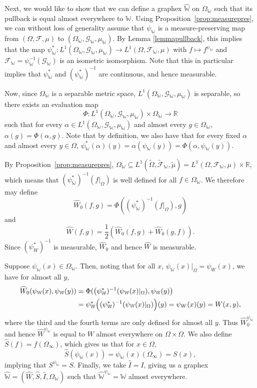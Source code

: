 \documentclass{amsart}
\numberwithin{equation}{section}
\numberwithin{figure}{section}
\theoremstyle{definition}
\theoremstyle{remark}
\newcommand{\wOmega}{{\widetilde{\Omega}}}
\newcommand{\wcF}{\widetilde{\mathcal{F}}}
\newcommand{\wmu}{\widetilde{\mu}}
\newcommand{\RR}{\mathbb{R}}
\newcommand{\cW}{\mathbb{W}}
\newcommand{\cF}{\mathcal{F}}
\newcommand{\cG}{\mathcal{G}}
\begin{document}
Next, we would like to show that we can define a graphex $\widehat{\cW}$ on
$\Omega_\cW $ such that its pullback is equal almost everywhere to $\cW$.
Using Proposition~\ref{prop:measurepres}, we can without loss of generality
assume that $\psi_\cW$ is a measure-preserving map from $(\Omega,\cF,\mu)$ to
$(\Omega_\cW,{\cG}_\cW,\mu_\cW)$. By Lemma \ref{lemmapullback}, this implies
that the map $\psi_\cW^*\colon L^1(\Omega_\cW,{\cG}_\cW,\mu_\cW) \rightarrow
L^1(\Omega,{\cF}_\cW,\mu)$ with $f\mapsto f^{\psi_\cW}$ and
${\cF}_\cW=\psi_\cW^{-1}(\cG_\cW)$ is an isometric isomorphism. Note that
this in particular implies that $\psi_\cW^*$ and $(\psi_\cW^*)^{-1}$ are
continuous, and hence measurable.

Now, since $\Omega_\cW$ is a separable metric space,
$L^1(\Omega_\cW,{\cG}_\cW,\mu_\cW)$ is separable, so there exists an
evaluation map
\[
\Phi\colon L^1(\Omega_\cW,{\cG}_\cW,\mu_\cW) \times \Omega_\cW \rightarrow \mathbb{R}
\]
such that for every $\alpha \in L^1(\Omega_\cW,{\cG}_\cW,\mu_\cW)$ and almost
every $g \in \Omega_\cW$, $\alpha(g)=\Phi(\alpha,g)$. Note that by
definition, we also have that for every fixed $\alpha$ and almost every $y
\in \Omega$,
$\psi_\cW^*(\alpha)(y)=\alpha(\psi_\cW(y))=\Phi(\alpha,\psi_\cW(y))$.

By Proposition~\ref{prop:measurepres}, $\Omega_\cW \subseteq L^1(\wOmega,
\wcF_\cW, \wmu)=L^1(\Omega,\cF_\cW,\mu) \times \RR$, which means that
$(\psi_\cW^*)^{-1}(f|_{\Omega})$ is well defined for all $f\in \Omega_\cW$.
We therefore may define
\[
\widehat{W}_{0}(f,g)=\Phi\left((\psi_\cW^*)^{-1}(f|_{\Omega}),g\right)
\]
and
\[
\widehat W(f,g)=\frac 12\left(\widehat{W}_{0}(f,g)+\widehat{W}_{0}(g,f)\right).
\]
Since $(\psi_W^*)^{-1}$ is measurable, $\widehat W_0$ and hence $\widehat W$
is measurable.

Suppose $\psi_\cW(x)\in \Omega_\cW$. Then, noting that for all $x$,
$\psi_\cW(x)|_{\Omega}=\psi_W(x)$, we have for almost all $y$,
\begin{align*}
\widehat W_0(\psi_\cW(x),\psi_\cW(y))&=\Phi(\left(\psi_\cW^*)^{-1}(\psi_\cW(x)|_{\Omega}),\psi_\cW(y)\right)\\
&=
\psi_\cW^*\Bigl((\psi_\cW^*)^{-1}(\psi_\cW(x)|_{\Omega})\Bigr)(y)
=\psi_W(x)(y)=W(x,y),
\end{align*}
where the third and the fourth terms are only defined for almost all $y$.
Thus $\widehat{W}_0^{\psi_\cW}$ and hence $\widehat{W}^{\psi_\cW}$ is equal
to $W$ almost everywhere on $\Omega \times \Omega$. We also define
$\widehat{S}(f)=f(\Omega_\infty)$, which gives us that for $x \in \Omega$,
\[\widehat{S}(\psi_\cW(x))=\psi_\cW(x)(\Omega_\infty)=S(x)
,\] implying that $S^{\psi_\cW}=S$. Finally, we take $\widehat{I}=I$, giving
us a graphex $\widehat{\cW}=(\widehat{W},\widehat{S},\widehat{I},\Omega_\cW)$
such that $\widehat{\cW}^{\psi_\cW}=\cW$ almost everywhere.
\end{document}
